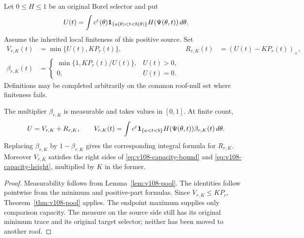 Let $0\le H\le1$ be an original Borel selector and put
\[
 U(t)=\int c^\varepsilon(\theta)\mathbf1_{\{a(\theta)<t<b(\theta)\}}
                         H(\Psi(\theta,t))\,d\theta.
\]
Assume the inherited local finiteness of this positive source. Set
\begin{equation}\label{eq:v108-allocation}
 \begin{aligned}
 V_{r,K}(t)&=\min\{U(t),KP_r(t)\},&
 R_{r,K}(t)&=(U(t)-KP_r(t))_+,\\
 \beta_{r,K}(t)&=\begin{cases}
    \min\{1,KP_r(t)/U(t)\},&U(t)>0,\\
    0,&U(t)=0.
   \end{cases}
 \end{aligned}
\end{equation}
Definitions may be completed arbitrarily on the common roof-null
set where finiteness fails.

\begin{corollary}
\label{cor:v108-allocation}
The multiplier $\beta_{r,K}$ is measurable and takes values in
$[0,1]$. At finite count,
\begin{equation}\label{eq:v108-source-split}
 U=V_{r,K}+R_{r,K},\qquad
 V_{r,K}(t)=\int c^\varepsilon\mathbf1_{\{a<t<b\}}
                    H(\Psi(\theta,t))\beta_{r,K}(t)\,d\theta.
\end{equation}
Replacing $\beta_{r,K}$ by $1-\beta_{r,K}$ gives the corresponding
integral formula for $R_{r,K}$. Moreover $V_{r,K}$ satisfies the
right sides of \eqref{eq:v108-capacity-bound} and
\eqref{eq:v108-capacity-height}, multiplied by $K$ in the former.
\end{corollary}
\begin{proof}
Measurability follows from Lemma~\ref{lem:v108-pool}. The identities
follow pointwise from the minimum and positive-part formulas.
Since $V_{r,K}\le KP_r$, Theorem~\ref{thm:v108-pool} applies.
The endpoint maximum supplies only comparison capacity. The measure
on the source side still has its original minimum trace and its
original target selector; neither has been moved to another roof.
\end{proof}
